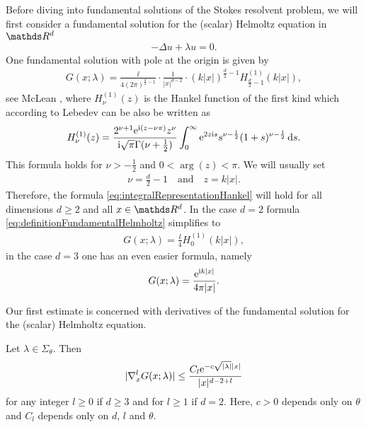 Before diving into fundamental solutions of the Stokes resolvent problem, we will first consider a fundamental solution for the (scalar) Helmoltz equation in $\R^d$
\begin{align*}
-\Delta u + \lambda u = 0.
\end{align*}
One fundamental solution with pole at the origin is given by
\begin{align}
  \label{eq:definitionFundamentalHelmholtz}
  G(x; \lambda) = \frac{\ii}{4 ( 2\pi )^{\frac{d}{2} - 1}} \cdot \frac{1}{|x|^{d - 2}} \cdot (k |x|)^{\frac{d}{2} - 1} H_{\frac{d}{2} - 1}^{(1)} (k|x|),
\end{align}
see McLean \cite[p. 282]{mclean}, where $H_{\nu}^{(1)}(z)$ is the Hankel function of the first kind which according to Lebedev \cite[Sec. 5.11]{lebedev} can be also be written as
\begin{align}
  \label{eq:integralRepresentationHankel}
  H_\nu^{(1)}(z) = \frac{2^{\nu + 1} \mathrm{e}^{\mathrm{i}(z - \nu \pi)} z^\nu}{\mathrm{i} \sqrt{\pi} \Gamma(\nu + \frac{1}{2})} \int_0^\infty \mathrm{e}^{2 z \mathrm{i} s} s^{\nu - \frac{1}{2}} (1 + s)^{\nu - \frac{1}{2}} \, {\operatorname{d}\!{s}}.
\end{align}
This formula holds for $\nu > -\frac{1}{2}$ and $0 < \arg(z) < \pi$.
We will usually set 
\begin{align*}
\nu = \frac{d}{2} - 1 \quad\text{and}\quad z = k|x|. 
\end{align*}
Therefore, the formula \eqref{eq:integralRepresentationHankel} will hold for all dimensions $d \geq 2$ and all $x \in \R^d$.
In the case $d = 2$ formula \eqref{eq:definitionFundamentalHelmholtz} simplifies to 
\begin{align}
  \label{eq:2dDefinitionFundamentalHelmholtz}
  G(x;\lambda) = \frac{\ii}{4} H_{0}^{(1)}(k|x|),
\end{align}
in the case $d = 3$ one has an even easier formula, namely
\begin{align}
  \label{eq:3dDefinitionFundamentalHelmholtz}
  G(x; \lambda) = \frac{\mathrm{e}^{\mathrm{i} k |x|}}{4 \pi |x|}.
\end{align}

Our first estimate is concerned with derivatives of the fundamental solution for the (scalar) Helmholtz equation.

\begin{lem}
  \label{lem:estimateHelmholtzDerivatives}
  Let $\lambda \in \Sigma_\theta$.
  Then
  \begin{align}
    \label{eq:estimateHelmholtzDerivatives}
    |\nabla_x^l G(x; \lambda)| \leq \frac{ C_l \mathrm{e}^{-c \sqrt{|\lambda|} |x|}}{|x|^{d - 2 + l}}
  \end{align}
  for any integer $l \geq 0$ if $d \geq 3$ and for $l \geq 1$ if $d = 2$.
  Here, $c > 0$ depends only on $\theta$ and $C_l$ depends only on $d$, $l$ and $\theta$.
\end{lem}

